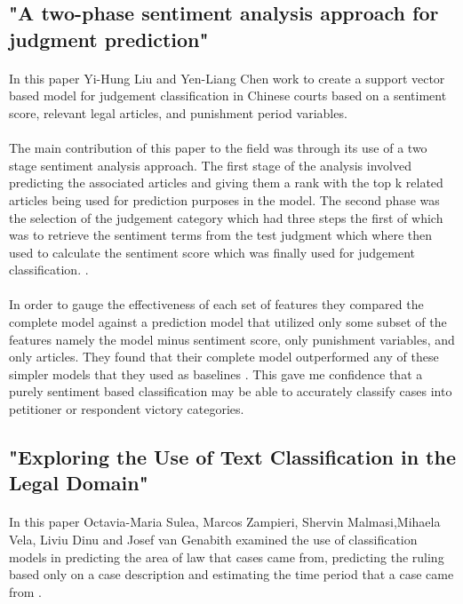 \documentclass[12pt,english]{article}
\begin{document}
\subsection{"A two-phase sentiment analysis approach for judgment prediction"}
\paragraph{}
In this paper Yi-Hung Liu and Yen-Liang Chen work to create a support vector based model for judgement classification in Chinese courts based on a sentiment score, relevant legal articles, and punishment period variables.
\paragraph{}
The main contribution of this paper to the field was through its use of a two stage sentiment analysis approach. The first stage of the analysis involved predicting the associated articles and giving them a rank with the top k related articles being used for prediction purposes in the model. The second phase was the selection of the judgement category which had three steps the first of which was to retrieve the sentiment terms from the test judgment which where then used to calculate the sentiment score which was finally used for judgement classification. \citep{liu_two-phase_2018}.
\paragraph{}
In order to gauge the effectiveness of each set of features they compared the complete model against a prediction model that utilized only some subset of the features namely the model minus sentiment score, only punishment variables, and only articles. They found that their complete model outperformed any of these simpler models that they used as baselines \citep{liu_two-phase_2018}. This gave me confidence that a purely sentiment based classification may be able to accurately classify cases into petitioner or respondent victory categories.
\paragraph{}
\subsection{"Exploring the Use of Text Classification in the Legal Domain"}
\paragraph{}
In this paper Octavia-Maria Sulea, Marcos Zampieri, Shervin Malmasi,Mihaela Vela, Liviu Dinu and Josef van Genabith examined the use of classification models in  predicting the area of law that cases came from, predicting the ruling based only on a case description and estimating the time period that a case came from \citep{sulea_exploring_2017}. 
\end{document}
